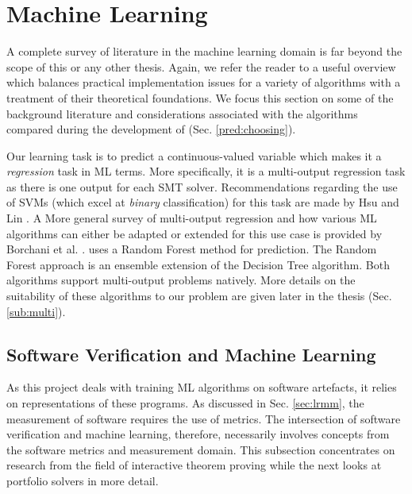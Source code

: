 \section{Machine Learning}
\label{sec:lrml}

A complete survey of literature in the machine learning domain is far beyond the scope of this or any other thesis. Again, we refer the reader to a useful overview \cite{Mitchell} which balances practical implementation issues for a variety of algorithms with a treatment of their theoretical foundations. We focus this section on some of the background literature and considerations associated with the algorithms compared during the development of \where (Sec. \ref{pred:choosing}).

Our learning task is to predict a continuous-valued variable which makes it a \textit{regression} task in ML terms. More specifically, it is a multi-output regression task as there is one output for each SMT solver. Recommendations regarding the use of SVMs (which excel at \textit{binary} classification) for this task are made by Hsu and Lin \cite{MulticlassSVM}. A More general survey of multi-output regression and how various ML algorithms can either be adapted or extended for this use case is provided by Borchani et al. \cite{multisurvey}. \where uses a Random Forest \cite{RandomForests} method for prediction. The Random Forest approach is an ensemble extension of the Decision Tree \cite{DecisionTrees} algorithm. Both algorithms support multi-output problems natively. More details on the suitability of these algorithms to our problem are given later in the thesis (Sec. \ref{sub:multi}). 



\subsection{Software Verification and Machine Learning}
\label{sub:lrsvml}

As this project deals with training ML algorithms on software artefacts, it relies on representations of these programs. As discussed in Sec. \ref{sec:lrmm}, the measurement of software requires the use of metrics. The intersection of software verification and machine learning, therefore, necessarily involves concepts from the software metrics and measurement domain. This subsection concentrates on research from the field of interactive theorem proving while the next looks at portfolio solvers in more detail.

